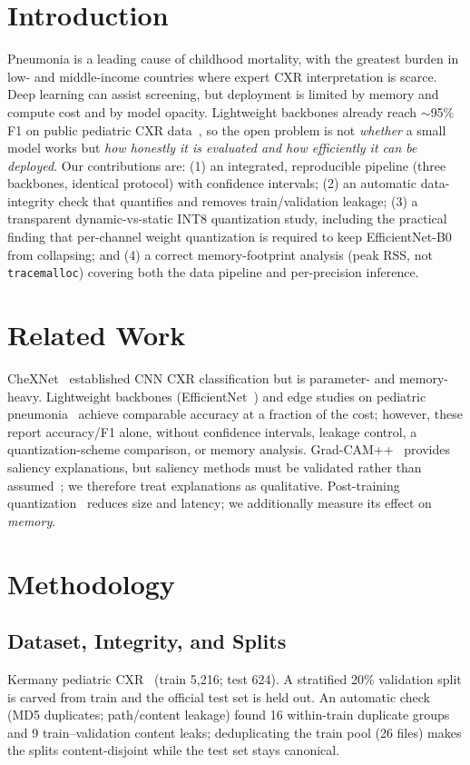 \documentclass[conference]{IEEEtran}
\begin{document}
\section{Introduction}
Pneumonia is a leading cause of childhood mortality, with the greatest burden in
low- and middle-income countries where expert CXR interpretation is scarce. Deep
learning can assist screening, but deployment is limited by memory and compute cost
and by model opacity. Lightweight backbones already reach $\sim$95\% F1 on public
pediatric CXR data~\cite{benmalek2025,pneunet2026}, so the open problem is not
\emph{whether} a small model works but \emph{how honestly it is evaluated and how
efficiently it can be deployed}. Our contributions are: (1) an integrated, reproducible
pipeline (three backbones, identical protocol) with confidence intervals; (2) an
automatic data-integrity check that quantifies and removes train/validation leakage;
(3) a transparent dynamic-vs-static INT8 quantization study, including the practical
finding that per-channel weight quantization is required to keep EfficientNet-B0 from
collapsing; and (4) a correct memory-footprint analysis (peak RSS, not
\texttt{tracemalloc}) covering both the data pipeline and per-precision inference.

\section{Related Work}
CheXNet~\cite{rajpurkar2017} established CNN CXR classification but is parameter- and
memory-heavy. Lightweight backbones (EfficientNet~\cite{tan2019}) and edge studies on
pediatric pneumonia~\cite{benmalek2025,pneunet2026} achieve comparable accuracy at a
fraction of the cost; however, these report accuracy/F1 alone, without confidence
intervals, leakage control, a quantization-scheme comparison, or memory analysis.
Grad-CAM++~\cite{chattopadhay2018} provides saliency explanations, but saliency methods
must be validated rather than assumed~\cite{saporta2022}; we therefore treat
explanations as qualitative. Post-training quantization~\cite{jacob2018} reduces size
and latency; we additionally measure its effect on \emph{memory}.

\section{Methodology}
\subsection{Dataset, Integrity, and Splits}
Kermany pediatric CXR~\cite{kermany2018} (train 5{,}216; test 624). A stratified 20\%
validation split is carved from train and the official test set is held out. An
automatic check (MD5 duplicates; path/content leakage) found 16 within-train duplicate
groups and 9 train--validation content leaks; deduplicating the train pool (26 files)
makes the splits content-disjoint while the test set stays canonical.

\end{document}
